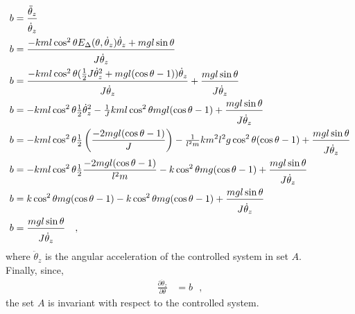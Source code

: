 \begin{align}
  b &= \frac{\ddot{\theta}_z}{\rule{0pt}{12pt}\dot{\theta}_z} \\
  b &= \frac{- k m l \cos^2 \theta E_\Delta( \theta, \dot{\theta}_z ) \dot{\theta}_z + m g l \sin \theta}{ J \rule{0pt}{12pt}\dot{\theta}_z} \\
  b &= \frac{- k m l \cos^2 \theta ( \tfrac{1}{2} J \dot{\theta}_z^2 + m g l (\cos \theta -1)  ) \dot{\theta}_z}{ J \rule{0pt}{12pt}\dot{\theta}_z}  +  \frac{m g l \sin \theta}{ J \rule{0pt}{12pt}\dot{\theta}_z} \\
  b &= - k m l \cos^2 \theta \tfrac{1}{2} \dot{\theta}_z^2 - \tfrac{1}{J} k m l \cos^2 \theta m g l (\cos \theta -1)  +  \frac{m g l \sin \theta}{ J \rule{0pt}{12pt}\dot{\theta}_z} \\
  b &= - k m l \cos^2 \theta \tfrac{1}{2} \left(\frac{-2 m g l (\cos \theta -1)}{J}\right)  - \tfrac{1}{l^2 m} k m^2 l^2 g \cos^2 \theta (\cos \theta -1)  +  \frac{m g l \sin \theta}{ J \rule{0pt}{12pt}\dot{\theta}_z} \\
  b &= - k m l \cos^2 \theta \tfrac{1}{2} \frac{-2 m g l (\cos \theta -1)}{l^2 m} - k \cos^2 \theta m g (\cos \theta -1)  +  \frac{m g l \sin \theta}{ J \rule{0pt}{12pt}\dot{\theta}_z}  \\
  b &= k \cos^2 \theta m g (\cos \theta -1) - k \cos^2 \theta m g (\cos \theta -1)  +  \frac{m g l \sin \theta}{ J \rule{0pt}{12pt}\dot{\theta}_z} \\
  b &= \frac{m g l \sin \theta}{ J \rule{0pt}{12pt}\dot{\theta}_z} \ \ \ ,  \label{eq:systemTrajSlopeInSetA}
\end{align}
where $\ddot{\theta}_z$ is the angular acceleration of the controlled system in set $A$.\\
Finally, since,
\begin{align}
  \frac{\partial \dot{\theta}_z}{\partial \theta} &= b \ \ \ ,  \label{eq:slopesEqual}
\end{align}
the set $A$ is invariant with respect to the controlled system. %
